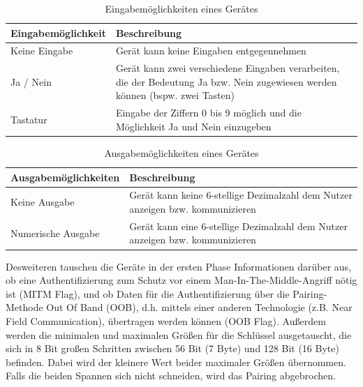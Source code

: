 \begin{table}[H]
    \begin{tabularx}{\textwidth}{|l|X|}
    \hline
    \textbf{Eingabemöglichkeit} & \textbf{Beschreibung} \\
    \hline
    Keine Eingabe & Gerät kann keine Eingaben entgegennehmen \\
    \hline
    Ja / Nein & Gerät kann zwei verschiedene Eingaben verarbeiten, die der Bedeutung Ja bzw. Nein zugewiesen werden können (bspw. zwei Tasten) \\
    \hline
    Tastatur & Eingabe der Ziffern 0 bis 9 möglich und die Möglichkeit Ja und Nein einzugeben \\
    \hline
    \end{tabularx}
    \caption[Eingabemöglichkeiten eines Gerätes]{Eingabemöglichkeiten eines Gerätes \cite{BtSpec4.0_1965}}
    \label{tab: i caps geraet}
\end{table}

\begin{table}[H]
    \begin{tabularx}{\textwidth}{|l|X|}
    \hline
    \textbf{Ausgabemöglichkeiten} & \textbf{Beschreibung} \\
    \hline
    Keine Ausgabe & Gerät kann keine 6-stellige Dezimalzahl dem Nutzer anzeigen bzw. kommunizieren \\
    \hline
    Numerische Ausgabe & Gerät kann eine 6-stellige Dezimalzahl dem Nutzer anzeigen bzw. kommunizieren \\
    \hline
    \end{tabularx}
    \caption[Ausgabemöglichkeiten eines Gerätes]{Ausgabemöglichkeiten eines Gerätes \cite{BtSpec4.0_1965_b}}
    \label{tab: o caps geraet}
\end{table}

Desweiteren tauschen die Geräte in der ersten Phase Informationen darüber aus, ob eine Authentifizierung zum Schutz vor einem Man-In-The-Middle-Angriff nötig ist (MITM Flag), und ob Daten für die Authentifizierung über die Pairing-Methode Out Of Band (OOB), d.h. mittels einer anderen Technologie (z.B. Near Field Communication), übertragen werden können (OOB Flag). Außerdem werden die minimalen und maximalen Größen für die Schlüssel ausgetauscht, die sich in 8 Bit großen Schritten zwischen 56 Bit (7 Byte) und 128 Bit (16 Byte) befinden. Dabei wird der kleinere Wert beider maximaler Größen übernommen. Falls die beiden Spannen sich nicht schneiden, wird das Pairing abgebrochen.

